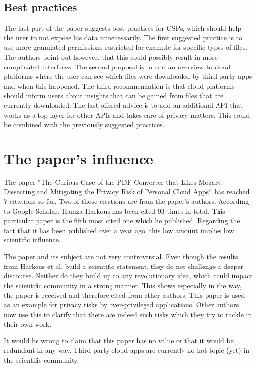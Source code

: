 \documentclass[11pt,twocolumn,a4paper,DIV=calc]{scrartcl}
\begin{document}
\subsection{Best practices}
The last part of the paper suggests best practices for CSPs, which should help the user to not expose his data unnecessarily. The first suggested practice is to use more granulated permissions restricted for example for specific types of files. The authors point out however, that this could possibly result in more complicated interfaces. The second proposal is to add an overview to cloud platforms where the user can see which files were downloaded by third party apps and when this happened. The third recommendation is that cloud platforms should inform users about insights that can be gained from files that are currently downloaded. The last offered advice is to add an additional API that works as a top layer for other APIs and takes care of privacy matters. This could be combined with the previously suggested practices.
\section{The paper's influence}
The paper ''The Curious Case of the PDF Converter that Likes Mozart: Dissecting and Mitigating the Privacy Risk of Personal Cloud Apps`` has reached 7 citations so far. Two of those citations are from the paper's authors. According to Google Scholar, Hamza Harkous has been cited 93 times in total.
This particular paper is the fifth most cited one which he published. Regarding the fact that it has been published over a year ago, this low amount implies low scientific influence.

The paper and its subject are not very controversial. Even though the results from Harkous et al. build a scientific statement, they do not challenge a deeper discourse. Neither do they build up to any revolutionary idea, which could impact the scientific community in a strong manner. This shows especially in the way, the paper is received and therefore cited from other authors. This paper is used as an example for privacy risks by over-privileged applications.
Other authors now use this to clarify that there are indeed such risks which they try to tackle in their own work.

It would be wrong to claim that this paper has no value or that it would be redundant in any way. Third party cloud apps are currently no hot topic (yet) in the scientific community.
 
\end{document}
